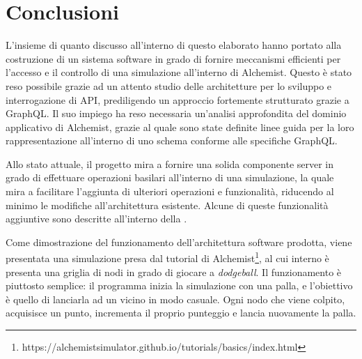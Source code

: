 \chapter{Conclusioni}\label{chap:conclusions}
L'insieme di quanto discusso all'interno di questo elaborato hanno portato alla costruzione di un sistema software in grado di fornire meccanismi efficienti per l'accesso
e il controllo di una simulazione all'interno di Alchemist. Questo è stato reso possibile grazie ad un attento studio delle architetture per lo sviluppo e interrogazione
di \ac{API}, prediligendo un approccio fortemente strutturato grazie a GraphQL. Il suo impiego ha reso necessaria un'analisi approfondita del dominio applicativo di Alchemist,
grazie al quale sono state definite linee guida per la loro rappresentazione all'interno di uno schema conforme alle specifiche GraphQL.

Allo stato attuale, il progetto mira a fornire una solida componente server in grado di effettuare operazioni basilari all'interno di una simulazione, la quale mira a facilitare
l'aggiunta di ulteriori operazioni e funzionalità, riducendo al minimo le modifiche all'architettura esistente. Alcune di queste funzionalità aggiuntive sono descritte all'interno
della .

Come dimostrazione del funzionamento dell'architettura software prodotta, viene presentata una simulazione presa dal tutorial di Alchemist\footnote{https://alchemistsimulator.github.io/tutorials/basics/index.html},
al cui interno è presenta una griglia di nodi in grado di giocare a \textit{dodgeball}. Il funzionamento è piuttosto semplice: il programma inizia la simulazione con una
palla, e l'obiettivo è quello di lanciarla ad un vicino in modo casuale. Ogni nodo che viene colpito, acquisisce un punto, incrementa il proprio punteggio e lancia nuovamente la palla.

